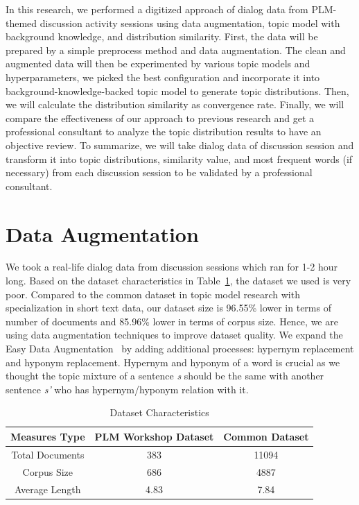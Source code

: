 \documentclass[senior]{IPSstyle}
\begin{document}
In this research, we performed a digitized approach of dialog data from PLM-themed discussion activity sessions using data augmentation, topic model with background knowledge, and distribution similarity. First, the data will be prepared by a simple preprocess method and data augmentation. The clean and augmented data will then be experimented by various topic models and hyperparameters, we picked the best configuration and incorporate it into background-knowledge-backed topic model to generate topic distributions. Then, we will calculate the distribution similarity as convergence rate. Finally, we will compare the effectiveness of our approach to previous research and get a professional consultant to analyze the topic distribution results to have an objective review. To summarize, we will take dialog data of discussion session and transform it into topic distributions, similarity value, and most frequent words (if necessary) from each discussion session to be validated by a professional consultant.

\section{Data Augmentation}

We took a real-life dialog data from discussion sessions which ran for 1-2 hour long. Based on the dataset characteristics in Table~\ref{table 1: dataset characteristics}, the dataset we used is very poor. Compared to the common dataset in topic model research with specialization in short text data, our dataset size is 96.55\% lower in terms of number of documents and 85.96\% lower in terms of corpus size. Hence, we are using data augmentation techniques to improve dataset quality. We expand the Easy Data Augmentation~\cite{wei} by adding additional processes: hypernym replacement and hyponym replacement. Hypernym and hyponym of a word is crucial as we thought the topic mixture of a sentence \textit{s} should be the same with another sentence \textit{s’} who has hypernym/hyponym relation with it.

\begin{table}[h]
\caption{Dataset Characteristics}
\label{table 1: dataset characteristics}
\centering
\small \begin{tabular}{|c|c|c|}
\hline
\textbf{Measures Type}&\textbf{PLM Workshop Dataset}&\textbf{Common Dataset \cite{qiang}}\\
\hline
Total Documents&383&11094  \\
\hline
Corpus Size&686&4887 \\
\hline
Average Length&4.83&7.84 \\
\hline
\end{tabular}
\end{table}
\end{document}
